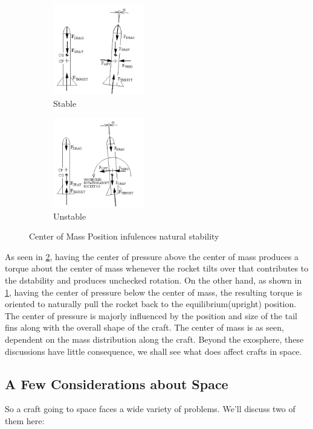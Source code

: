 \documentclass[12pt, letterpaper]{article}
\begin{document}
\begin{figure}[h!]
\centering
\begin{subfigure}{.5\textwidth}
  \centering
  \includegraphics[width=150px]{stable}
  \caption{Stable}
  \label{fig:stable}
\end{subfigure}%
\begin{subfigure}{.5\textwidth}
  \centering
  \includegraphics[width=150px]{unstable}
  \caption{Unstable}
  \label{fig:unstable}
\end{subfigure}
\caption{Center of Mass Position infulences natural stability}
\label{fig:COP}
\end{figure}

As seen in \ref{fig:unstable}, having the center of pressure above the center of mass produces a torque about the center of mass whenever the rocket tilts over that contributes to the dstability and produces unchecked rotation. On the other hand, as shown in \ref{fig:stable}, having the center of pressure below the center of mass, the resulting torque is oriented to naturally pull the rocket back to the equilibrium(upright) position. The center of pressure is majorly influenced by the position and size of the tail fins along with the overall shape of the craft. The center of mass is as seen, dependent on the mass distribution along the craft. Beyond the exosphere, these discussions have little consequence, we shall see what does affect crafts in space.

\subsection{A Few Considerations about Space}
So a craft going to space faces a wide variety of problems. We'll discuss two of them here:
\end{document}
